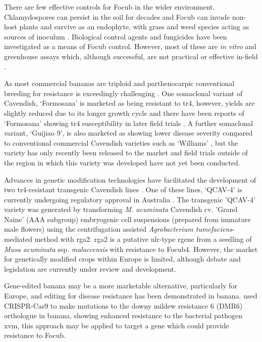 There are few effective controls for \ac{Focub} in the wider environment. Chlamydospores can persist in the soil for decades and \ac{Focub} can invade non-host plants and survive as an endophyte, with grass and weed species acting as sources of inoculum \parencite{Pegg2019}. Biological control agents and fungicides have been investigated as a means of \ac{Focub} control. However, most of these are \textit{in vitro} and greenhouse assays which, although successful, are not practical or effective in-field \parencite{Dita2018}.  

As most commercial bananas are triploid and parthenocarpic conventional breeding for resistance is exceedingly challenging \parencite{Dale2017}. One somaclonal variant of Cavendish, ‘Formosana’ is marketed as being resistant to \ac{tr4}, however, yields are slightly reduced due to its longer growth cycle and there have been reports of  ‘Formosana’ showing \ac{tr4} susceptibility in later field trials \parencite{Lee2011, Dale2017}. A further somaclonal variant, ‘Guijiao 9’, is also marketed as showing lower disease severity compared to conventional commercial Cavendish varieties such as ‘Williams’ \parencite{Sun2019}, but the variety has only recently been released to the market and field trials outside of the region in which this variety was developed have not yet been conducted.  

Advances in genetic modification technologies have facilitated the development of two \ac{tr4}-resistant transgenic Cavendish lines \parencite{Dale2017}. One of these lines, ‘QCAV-4’ is currently undergoing regulatory approval in Australia \parencite{Lu2023}. The transgenic 'QCAV-4' variety was generated by transforming \textit{M. acuminata }Cavendish cv. 'Grand Naine' (AAA subgroup) embryogenic cell suspensions (prepared from immature male flowers) using the centrifugation assisted \textit{Agrobacterium tumefaciens}-mediated method with \ac{rga2}. \ac{rga2} is a putative \ac{nlr}-type \ac{rgene} from a seedling of \textit{Musa acuminata} ssp. \textit{malaccensis} with resistance to \ac{Focub4}. However, the market for genetically modified crops within Europe is limited, although debate and legislation are currently under review and development. 

Gene-edited banana may be a more marketable alternative, particularly for Europe, and editing for disease resistance has been demonstrated in banana. \textcite{Tripathi2021} used CRISPR-Cas9 to make mutations to the downy mildew resistance 6 (DMR6) orthologue in banana, showing enhanced resistance to the bacterial pathogen \ac{xvm}, this approach may be applied to target a gene which could provide resistance to \ac{Focub}.  

